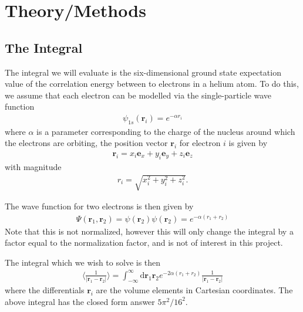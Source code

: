 \documentclass[twoside, 11pt]{article}
\renewcommand{\d}{\mathrm{d}}
\begin{document}
\section{Theory/Methods}
	\subsection{The Integral}
		The integral we will evaluate is the six-dimensional ground state expectation value of the correlation energy between to electrons in a helium atom. To do this, we assume that each electron can be modelled via the single-particle wave function
		\begin{align}
			\psi_{1s} (\mathbf{r}_i) = e^{-\alpha r_i}
		\end{align}
		where $\alpha$ is a parameter corresponding to the charge of the nucleus around which the electrons are orbiting, the position vector $\mathbf{r}_i$ for electron $i$ is given by
		\begin{align}
			\mathbf{r}_i = x_i \mathbf{e}_x + y_i \mathbf{e}_y + z_i \mathbf{e}_z
		\end{align}
		with magnitude
		\begin{align}
			r_i = \sqrt{x_i^2 + y_i^2 + z_i^2}.
		\end{align}
		
		The wave function for two electrons is then given by
		\begin{align}
			\Psi(\mathbf{r}_1, \mathbf{r}_2) = \psi(\mathbf{r}_2)\psi(\mathbf{r}_2) = e^{-\alpha(r_1 + r_2)}
		\end{align}
		Note that this is not normalized, however this will only change the integral by a factor equal to the normalization factor, and is not of interest in this project.
		
		The integral which we wish to solve is then
		\begin{align}
			\langle \frac{1}{|\mathbf{r}_1 - \mathbf{r}_2|} \rangle = \int_{-\infty}^{\infty} \d\mathbf{r}_1 \mathbf{r}_2 e^{-2\alpha(r_1+r_2)} \frac{1}{|\mathbf{r}_1 - \mathbf{r}_2|} \label{eq: unchanged integral}
		\end{align}
		where the differentials $\mathbf{r}_i$ are the volume elements in Cartesian coordinates. The above integral has the closed form answer $5\pi^2/16^2$.
		
\end{document}
